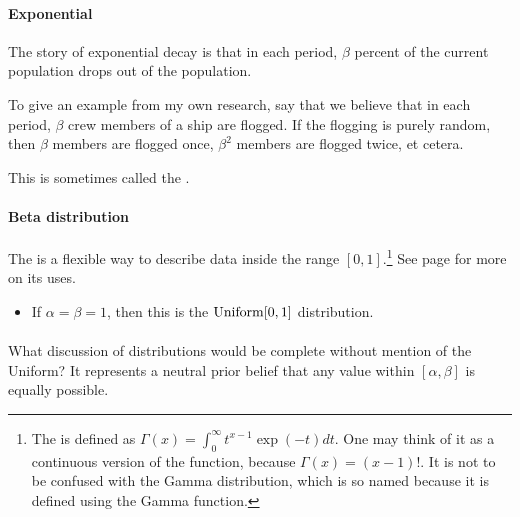 \paragraph{Exponential}

The story of exponential decay is that in each period, $\beta$ percent
of the current population drops out of the population.

To give an example from my own research, say that we believe that in
each period, $\beta$ crew members of a ship are flogged. If the flogging
is purely random, then $\beta$ members are flogged once, $\beta^2$
members are flogged twice, et cetera.

This is sometimes called the .



\paragraph{Beta distribution} The  is a flexible
way to describe data inside the range $[0, 1]$.\footnote{The  is defined as $\Gamma(x) = \int_0^\infty  t^{x-1} \exp(-t)
dt$. One may think of it as a continuous version of the 
function, because $\Gamma(x) = (x-1)!$. It is not to be confused with
the Gamma distribution, which is so named because it is defined using
the Gamma function.}
See page \pageref{beta} for more on its uses.


\begin{itemize}
\item If $\alpha = \beta = 1$, then this is the ${\rm Uniform}[0,1]$ distribution.
\end{itemize}


\paragraph{} What discussion of distributions
would be complete without mention of the Uniform? It represents a neutral
prior belief that any value within $[\alpha, \beta]$ is equally possible.

